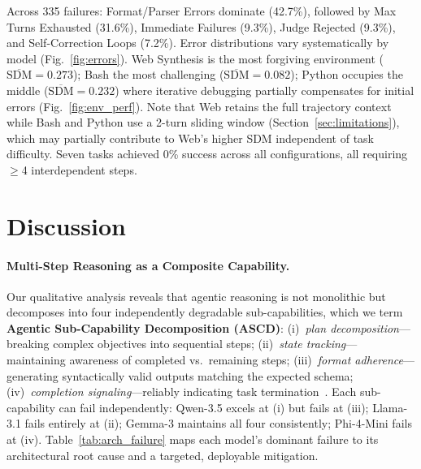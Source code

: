 \documentclass{article}
\begin{document}
Across 335 failures: Format/Parser Errors dominate (42.7\%), followed by Max Turns Exhausted (31.6\%), Immediate Failures (9.3\%), Judge Rejected (9.3\%), and Self-Correction Loops (7.2\%). Error distributions vary systematically by model (Fig.~\ref{fig:errors}). Web Synthesis is the most forgiving environment ($\overline{\text{SDM}}=0.273$); Bash the most challenging ($\overline{\text{SDM}}=0.082$); Python occupies the middle ($\overline{\text{SDM}}=0.232$) where iterative debugging partially compensates for initial errors (Fig.~\ref{fig:env_perf}). Note that Web retains the full trajectory context while Bash and Python use a 2-turn sliding window (Section~\ref{sec:limitations}), which may partially contribute to Web's higher SDM independent of task difficulty. Seven tasks achieved 0\% success across all configurations, all requiring $\geq$4 interdependent steps.

\section{Discussion}

\paragraph{Multi-Step Reasoning as a Composite Capability.}
Our qualitative analysis reveals that agentic reasoning is not monolithic but decomposes into four independently degradable sub-capabilities, which we term \textbf{Agentic Sub-Capability Decomposition (ASCD)}: (i)~\emph{plan decomposition}---breaking complex objectives into sequential steps; (ii)~\emph{state tracking}---maintaining awareness of completed vs.\ remaining steps; (iii)~\emph{format adherence}---generating syntactically valid outputs matching the expected schema; (iv)~\emph{completion signaling}---reliably indicating task termination~\cite{wang2024survey,xi2023rise}. Each sub-capability can fail independently: Qwen-3.5 excels at (i) but fails at (iii); Llama-3.1 fails entirely at (ii); Gemma-3 maintains all four consistently; Phi-4-Mini fails at (iv). Table~\ref{tab:arch_failure} maps each model's dominant failure to its architectural root cause and a targeted, deployable mitigation.
\end{document}
